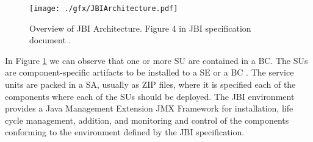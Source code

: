 \begin{figure}[htb]
	\centering
		\texttt{[image: ./gfx/JBIArchitecture.pdf]}
	\caption[JBI Architecture]{Overview of JBI Architecture. Figure 4 in JBI specification document \cite{JBI2005}.}
	\label{fig:jbi}
\end{figure}

In Figure \ref{fig:jbi} we can observe that one or more \ac{SU} are contained in a \ac{BC}. The \ac{SU}s are component-specific artifacts to be installed to a \ac{SE} or a \ac{BC} \cite{JBI2005}. The service units are packed in a \ac{SA}, usually as ZIP files, where it is specified each of the components where each of the \ac{SU}s should be deployed. The \ac{JBI} environment provides a Java Management Extension \ac{JMX} Framework for installation, life cycle management, addition, and monitoring and control of the components conforming to the environment defined by the JBI specification.

\FloatBarrier